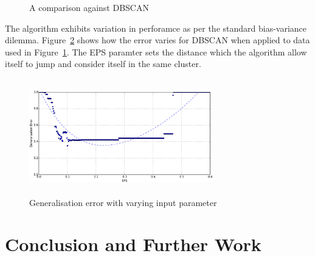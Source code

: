 \documentclass{ecsarticle}     %
\begin{document}
\begin{figure}[ht]
   \centering
   \caption{A comparison against DBSCAN}
   \label{fig:compare}
\end{figure}

The algorithm exhibits variation in perforamce as per the standard bias-variance dilemma.
Figure~\ref{fig:error} shows how the error varies for DBSCAN when applied to data used in Figure~\ref{fig:compare}.
The EPS paramter sets the distance which the algorithm allow itself to jump and consider itself in the same cluster.

\begin{figure}[ht]
   \centering
    \includegraphics[height = 5cm,width = 8cm]{error.pdf}
   \caption{Generalisation error with varying input parameter}
   \label{fig:error}
\end{figure}




\section{Conclusion and Further Work}




\end{document}
